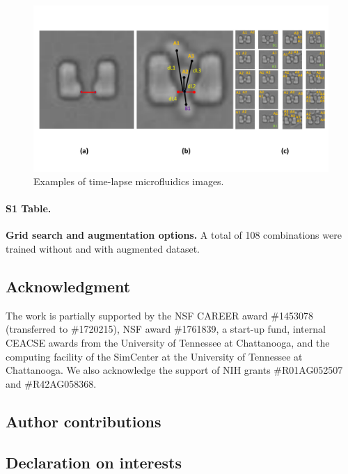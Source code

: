 \documentclass[conference]{IEEEtran}
\begin{document}
\begin{figure}
\centering
\includegraphics[width=\textwidth,height=10 cm]{Patterns/point.pdf}
\caption{ Examples of time-lapse microfluidics images.}
\label{fig:imageData}
\end{figure} 



\paragraph*{S1 Table.}


\label{S1_Table}
{\bf Grid search and augmentation options.} A total of 108 combinations were trained without and with augmented dataset. 


\subsection*{Acknowledgment}

The work is partially supported by the NSF CAREER award \#1453078 (transferred to \#1720215), NSF award \#1761839, a  start-up fund, internal CEACSE awards from the University of Tennessee at Chattanooga, and the computing facility of the SimCenter at the University of Tennessee at Chattanooga. We also acknowledge the support of NIH grants \#R01AG052507 and \#R42AG058368.


\subsection*{Author contributions}


\subsection*{Declaration on interests}
\end{document}
